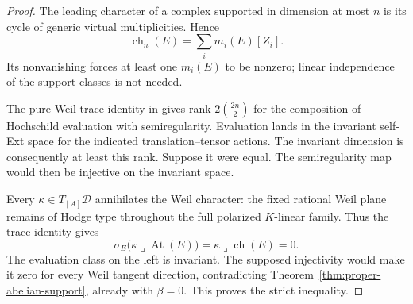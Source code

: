 \documentclass[11pt]{article}
\makeatletter
\providecommand{\compref}[1]{\csname external@#1\endcsname}
\theoremstyle{definition}
\theoremstyle{remark}
\makeatother
\begin{document}
\begin{proof}
The leading character of a complex supported in dimension at most
$n$ is its cycle of generic virtual multiplicities.  Hence
\[
 \operatorname{ch}_n(E)=\sum_i m_i(E)[Z_i].
\]
Its nonvanishing forces at least one $m_i(E)$ to be nonzero;
linear independence of the support classes is not needed.

The pure-Weil trace identity in
\cite[Theorem~\compref{thm:pure-weil-ext}]{CompanionA} gives rank
$2\binom{2n}{2}$ for the composition of Hochschild evaluation with
semiregularity.  Evaluation lands in the invariant self-Ext space
for the indicated translation--tensor actions.  The invariant
dimension is consequently at least this rank.  Suppose it were
equal.  The semiregularity map would then be injective on the
invariant space.

Every $\kappa\in T_{[A]}\mathcal D$ annihilates the Weil character:
the fixed rational Weil plane remains of Hodge type throughout
the full polarized $K$-linear family.  Thus the trace identity gives
\[
 \sigma_E\bigl(\kappa\mathbin{\lrcorner}
                        \operatorname{At}(E)\bigr)
       =\kappa\mathbin{\lrcorner}\operatorname{ch}(E)=0.
\]
The evaluation class on the left is invariant.  The supposed
injectivity would make it zero for every Weil tangent direction,
contradicting Theorem~\ref{thm:proper-abelian-support}, already
with $\beta=0$.  This proves the strict inequality.
\end{proof}
\end{document}
